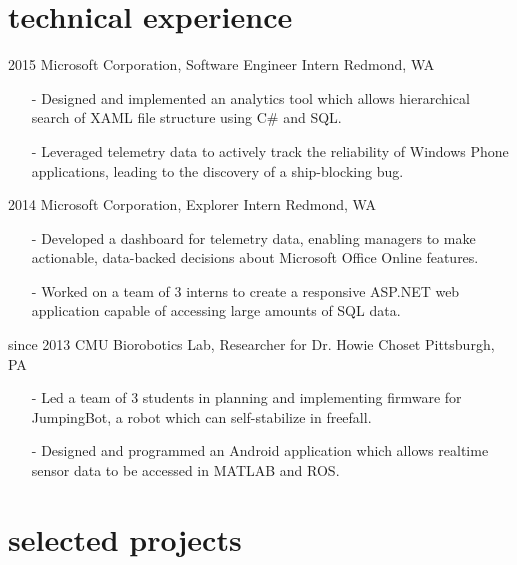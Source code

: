 \documentclass[print]{friggeri-cv}
\begin{document}
    \section{technical experience}

    \begin{entrylist}
        \entrys
            {2015}
            {Microsoft Corporation, {\normalfont Software Engineer Intern}}
            {Redmond, WA}
            {\begin{itemize}[leftmargin=*]
                \item[-] Designed and implemented an analytics tool which allows hierarchical search of XAML file structure using C\# and SQL.
                \item[-] Leveraged telemetry data to actively track the reliability of Windows Phone applications, leading to the discovery of a ship-blocking bug.
             \end{itemize}}
        \entrys
            {2014}
            {Microsoft Corporation, {\normalfont Explorer Intern}}
            {Redmond, WA}
            {\begin{itemize}[leftmargin=*]
                \item[-] Developed a dashboard for telemetry data, enabling managers to make actionable, data-backed decisions about Microsoft Office Online features.
                \item[-] Worked on a team of 3 interns to create a responsive ASP.NET web application capable of accessing large amounts of SQL data.
             \end{itemize}}
        \entrys
            {since 2013}
            {CMU Biorobotics Lab, {\normalfont Researcher for Dr. Howie Choset}}
            {Pittsburgh, PA}
            {\begin{itemize}[leftmargin=*]
                \item[-] Led a team of 3 students in planning and implementing firmware for JumpingBot, a robot which can self-stabilize in freefall.
                \item[-] Designed and programmed an Android application which allows realtime sensor data to be accessed in MATLAB and ROS.
            \end{itemize}}
    \end{entrylist}

    \section{selected projects}
\end{document}
